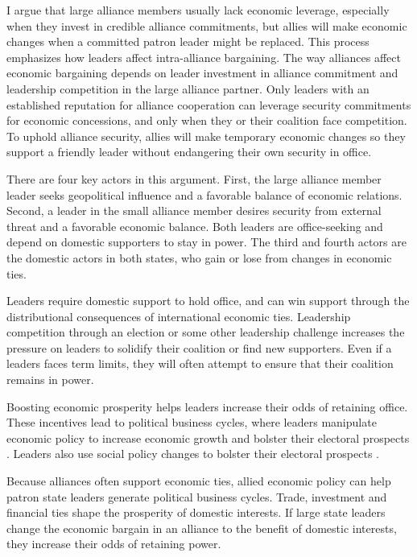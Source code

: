 \documentclass[12pt]{article}
\begin{document}
I argue that large alliance members usually lack economic leverage, especially when they invest in credible alliance commitments, but allies will make economic changes when a committed patron leader might be replaced. 
This process emphasizes how leaders affect intra-alliance bargaining. 
The way alliances affect economic bargaining depends on leader investment in alliance commitment and leadership competition in the large alliance partner.  
Only leaders with an established reputation for alliance cooperation can leverage security commitments for economic concessions, and only when they or their coalition face competition. 
To uphold alliance security, allies will make temporary economic changes so they support a friendly leader without endangering their own security in office. 


There are four key actors in this argument. 
First, the large alliance member leader seeks geopolitical influence and a favorable balance of economic relations. 
Second, a leader in the small alliance member desires security from external threat and a favorable economic balance.
Both leaders are office-seeking and depend on domestic supporters to stay in power.
The third and fourth actors are the domestic actors in both states, who gain or lose from changes in economic ties. 


Leaders require domestic support to hold office, and can win support through the distributional consequences of international economic ties. 
Leadership competition through an election or some other leadership challenge increases the pressure on leaders to solidify their coalition or find new supporters. 
Even if a leaders faces term limits, they will often attempt to ensure that their coalition remains in power.  


Boosting economic prosperity helps leaders increase their odds of retaining office. 
These incentives lead to political business cycles, where leaders manipulate economic policy to increase economic growth and bolster their electoral prospects \citep{Rogoff1987, ClarkHallerberg2000}.
Leaders also use social policy changes to bolster their electoral prospects \citep{Ahlquist2010, Philips2020}. 


Because alliances often support economic ties, allied economic policy can help patron state leaders generate political business cycles. 
Trade, investment and financial ties shape the prosperity of domestic interests.
If large state leaders change the economic bargain in an alliance to the benefit of domestic interests, they increase their odds of retaining power. 
\end{document}
